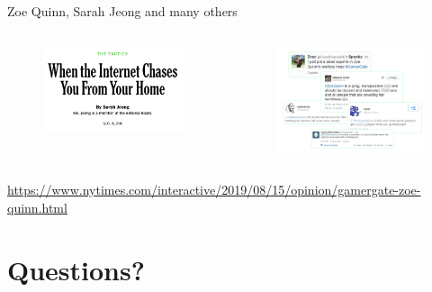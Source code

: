 \documentclass[nobackground,dvipsnames,table]{beamer}
\begin{document}
\begin{frame}{Zoe Quinn, Sarah Jeong and many others}
    \begin{columns}[T]
            \begin{figure}
                \includegraphics[width=\textwidth]{sarah-jeong-nyt-article}
            \end{figure}
            \begin{figure}
                \includegraphics[width=\textwidth]{zoe-quinn-threatening-tweets}
            \end{figure}
    \end{columns}
    
    \tiny
    \url{https://www.nytimes.com/interactive/2019/08/15/opinion/gamergate-zoe-quinn.html}
\end{frame}

\section{Questions?}
\end{document}
